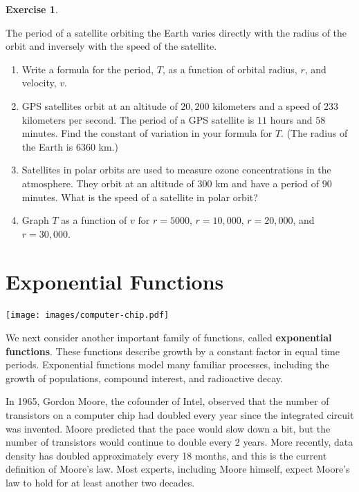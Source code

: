 \documentclass[10pt,]{book}
\newcommand{\terminology}[1]{\textbf{#1}}
\theoremstyle{plain}
\theoremstyle{definition}
\theoremstyle{definition}
\theoremstyle{definition}
\theoremstyle{definition}
\theoremstyle{definition}
\newtheorem{exercise}[theorem]{Exercise}
\numberwithin{equation}{section}
\begin{document}
\begin{exercise}\label{exercise-satellite-period}

    The period of a satellite orbiting the Earth varies directly with the radius of the orbit and inversely with the speed of the satellite.
    \leavevmode%
\begin{enumerate}[label=*\alph**]
\item\hypertarget{li-590}{}Write a formula for the period, \(T\), as a function of orbital radius, \(r\), and velocity, \(v\).\item\hypertarget{li-591}{}GPS satellites orbit at an altitude of \(20,200\) kilometers and a speed of \(233\) kilometers per second. The period of a GPS satellite is \(11\) hours and \(58\) minutes. Find the constant of variation in your formula for \(T\). (The radius of the Earth is \(6360\) km.)\item\hypertarget{li-592}{}Satellites in polar orbits are used to measure ozone concentrations in the atmosphere. They orbit at an altitude of \(300\) km and have a period of \(90\) minutes. What is the speed of a satellite in polar orbit?\item\hypertarget{li-593}{}Graph \(T\) as a function of \(v\) for \(r = 5000\), \(r = 10,000\), \(r = 20,000\), and \(r = 30,000\).\end{enumerate}

%
\end{exercise}
\typeout{************************************************}
\typeout{************************************************}
\chapter[Exponential Functions]{Exponential Functions}\label{chap4}
\typeout{************************************************}
\typeout{************************************************}
\texttt{[image: images/computer-chip.pdf]}%
\par

    We next consider another important family of functions, called \terminology{exponential functions}. These functions describe growth by a constant factor in equal time periods. Exponential functions model many familiar processes, including the growth of populations, compound interest, and radioactive decay.
%
\par

    In 1965, Gordon Moore, the cofounder of Intel, observed that the number of transistors on a computer chip had doubled every year since the integrated circuit was invented. Moore predicted that the pace would slow down a bit, but the number of transistors would continue to double every 2 years. More recently, data density has doubled approximately every 18 months, and this is the current definition of Moore's law. Most experts, including Moore himself, expect Moore's law to hold for at least another two decades.
%
\typeout{************************************************}
\typeout{************************************************}
\end{document}
